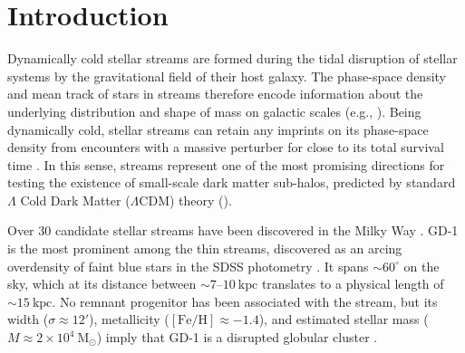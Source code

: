 \documentclass[modern]{aastex62}
\newcommand{\msun}{\textrm{M}_\odot}
\newcommand{\kpc}{\textrm{kpc}}
\newcommand{\feh}{\ensuremath{[\textrm{Fe} / \textrm{H}]}}
\begin{document}

\section{Introduction}
\label{sec:intro}

Dynamically cold stellar streams are formed during the tidal disruption of stellar
systems by the gravitational field of their host galaxy.
The phase-space density and mean track of stars in streams therefore encode
information about the underlying distribution and shape of mass on galactic
scales (e.g., \citealt{Johnston:1999, Bonaca:2018}).
Being dynamically cold, stellar streams can retain any imprints on its phase-space density from encounters with a massive perturber for close to its total survival time \citep[e.g.,][]{Yoon:2011}.
In this sense, streams represent one of the most promising directions for
testing the existence of small-scale dark matter sub-halos, predicted by
standard $\Lambda$ Cold Dark Matter ($\Lambda$CDM) theory
(\citealt{Erkal:2015, Sanders:2016, Bovy:2017}).

Over 30 candidate stellar streams have been discovered in the Milky Way \citep[see][for a recent review]{Grillmair:2016, Newberg:2016}.
GD-1 is the most prominent among the thin streams, discovered as an arcing overdensity of faint blue stars in the SDSS photometry \citep{Grillmair:2006}.
It spans $\sim 60^\circ$ on the sky, which at its distance between $\sim 7$--$10~\textrm{kpc}$ translates to a physical length of $\sim 15~\kpc$.
No remnant progenitor has been associated with the stream, but its
width ($\sigma \approx 12'$), metallicity ($\feh \approx -1.4$), and estimated
stellar mass ($M \approx 2 \times 10^4~\msun$)
imply that GD-1 is a disrupted globular cluster \citep{Koposov:2010}.
\end{document}

